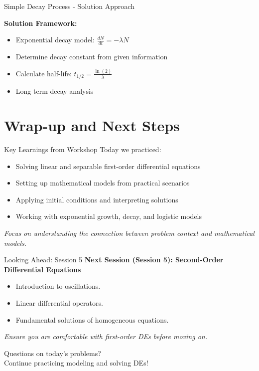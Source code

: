 \documentclass[10pt,aspectratio=169]{beamer}
\newcommand{\emphasis}[1]{\textit{#1}}
\begin{document}
\begin{frame}{Simple Decay Process - Solution Approach}
    \begin{solutionbox}
        \textbf{Solution Framework:}
        \begin{itemize}
            \item Exponential decay model: $\frac{dN}{dt} = -\lambda N$
            \item Determine decay constant from given information
            \item Calculate half-life: $t_{1/2} = \frac{\ln(2)}{\lambda}$
            \item Long-term decay analysis
        \end{itemize}
    \end{solutionbox}
\end{frame}

\section{Wrap-up and Next Steps}
\begin{frame}{Key Learnings from Workshop}
    Today we practiced:
    \begin{itemize}
        \item Solving linear and separable first-order differential equations
        \item Setting up mathematical models from practical scenarios
        \item Applying initial conditions and interpreting solutions
        \item Working with exponential growth, decay, and logistic models
    \end{itemize}
    \emphasis{Focus on understanding the connection between problem context and mathematical models.}
\end{frame}

\begin{frame}{Looking Ahead: Session 5}
    \textbf{Next Session (Session 5): Second-Order Differential Equations}
    \begin{itemize}
        \item Introduction to oscillations.
        \item Linear differential operators.
        \item Fundamental solutions of homogeneous equations.
    \end{itemize}
    \emphasis{Ensure you are comfortable with first-order DEs before moving on.}
\end{frame}

\begin{frame}[standout]
    Questions on today's problems? \\
    Continue practicing modeling and solving DEs!
\end{frame}
\end{document}
